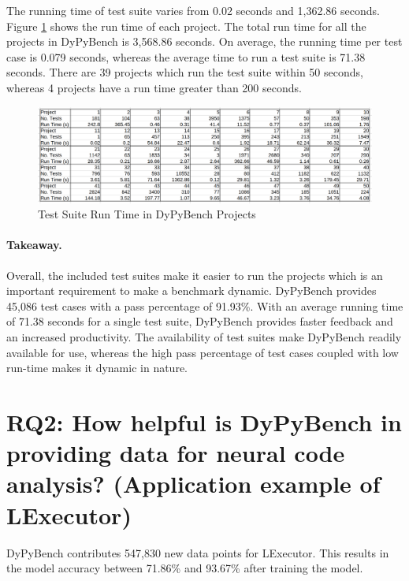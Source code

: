 The running time of test suite varies from 0.02 seconds and 1,362.86 seconds.
Figure \ref{fig:test_run_times} shows the run time of each project.
The total run time for all the projects in DyPyBench is 3,568.86 seconds.
On average, the running time per test case is 0.079 seconds, whereas the average time to run a test suite is 71.38 seconds. 
There are 39 projects which run the test suite within 50 seconds, whereas 4 projects have a run time greater than 200 seconds.
\begin{figure}[ht]
    \centering
    \includegraphics[width=1\linewidth]{figures/evaluation/tests_runtime2.png}
    \caption[Test Suite Run Time]{\label{fig:test_run_times}Test Suite Run Time in DyPyBench Projects}
\end{figure}

\paragraph{Takeaway.} Overall, the included test suites make it easier to run the projects which is an important requirement to make a benchmark dynamic.
DyPyBench provides 45,086 test cases with a pass percentage of 91.93\%. 
With an average running time of 71.38 seconds for a single test suite, DyPyBench provides faster feedback and an increased productivity.
The availability of test suites make DyPyBench readily available for use, whereas the high pass percentage of test cases coupled with low run-time makes it dynamic in nature.

\section{RQ2: How helpful is DyPyBench in providing data for neural code analysis? (Application example of LExecutor)}

DyPyBench contributes 547,830 new data points for LExecutor. 
This results in the model accuracy between 71.86\% and 93.67\% after training the model.

